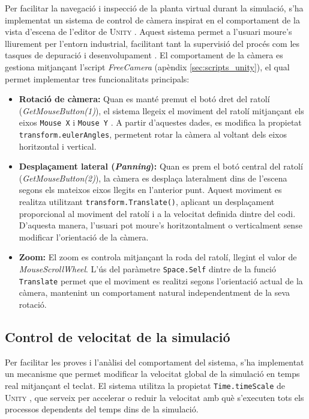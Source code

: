 \documentclass[a4paper,11pt,DIV=13,headings=normal,abstract=true,twoside=semi]{article}
\newcommand{\acro}[1]{\textsc{#1}}
\begin{document}
Per facilitar la navegació i inspecció de la planta virtual durant la simulació, s'ha implementat un sistema de control de càmera inspirat en el comportament de la vista d'escena de l'editor de \acro{Unity} \cite{UnitySceneNavigation}. Aquest sistema permet a l'usuari moure's lliurement per l'entorn industrial, facilitant tant la supervisió del procés com les tasques de depuració i desenvolupament \cite{GameDeveloperCamera}. El comportament de la càmera es gestiona mitjançant l'script \emph{FreeCamera} (apèndix \ref{sec:scripts_unity}), el qual permet implementar tres funcionalitats principals:

\begin{itemize}
    \item \textbf{Rotació de càmera:} Quan es manté premut el botó dret del ratolí (\emph{GetMouseButton(1)}), el sistema llegeix el moviment del ratolí mitjançant els eixos \texttt{Mouse X} i \texttt{Mouse Y} \cite{UnityInput}. A partir d'aquestes dades, es modifica la propietat \texttt{transform.eulerAngles}, permetent rotar la càmera al voltant dels eixos horitzontal i vertical. 
    \item \textbf{Desplaçament lateral (\emph{Panning}):} Quan es prem el botó central del ratolí (\emph{GetMouseButton(2)}), la càmera es desplaça lateralment dins de l'escena segons els mateixos eixos llegits en l'anterior punt. Aquest moviment es realitza utilitzant \texttt{transform.Translate()}, aplicant un desplaçament proporcional al moviment del ratolí i a la velocitat definida dintre del codi. D'aquesta manera, l'usuari pot moure's horitzontalment o verticalment sense modificar l'orientació de la càmera.
    \item \textbf{Zoom:} El zoom es controla mitjançant la roda del ratolí, llegint el valor de \emph{MouseScrollWheel}. L'ús del paràmetre \texttt{Space.Self} dintre de la funció \texttt{Translate} \cite{UnityTransformTranslate} permet que el moviment es realitzi segons l'orientació actual de la càmera, mantenint un comportament natural independentment de la seva rotació.
\end{itemize}


\subsection{Control de velocitat de la simulació}

Per facilitar les proves i l'anàlisi del comportament del sistema, s'ha implementat un mecanisme que permet modificar la velocitat global de la simulació en temps real mitjançant el teclat. El sistema utilitza la propietat \texttt{Time.timeScale} de \acro{Unity} \cite{UnityTimeScale}, que serveix per accelerar o reduir la velocitat amb què s'executen tots els processos dependents del temps dins de la simulació. 
\end{document}
